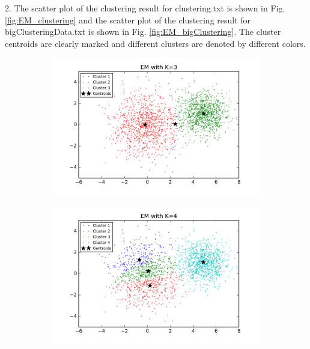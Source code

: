\begin{description}
\begin{description}
\item{2.} The scatter plot of the clustering result for clustering.txt is shown in Fig. \ref{fig:EM_clustering} and the scatter plot of the clustering result for bigClusteringData.txt is shown in Fig. \ref{fig:EM_bigClustering}. The cluster centroids are clearly marked and different clusters are denoted by different colors. 

\begin{figure}[!h]
        \centering
        \begin{subfigure}[b]{0.475\textwidth}
            \centering
            \includegraphics[width=\textwidth]{./figures/clustering_EM_3.png}
        \end{subfigure}
        \hfill
        \begin{subfigure}[b]{0.475\textwidth}  
            \centering 
            \includegraphics[width=\textwidth]{./figures/clustering_EM_4.png}

\end{subfigure}
\end{figure}
\end{description}
\end{description}
